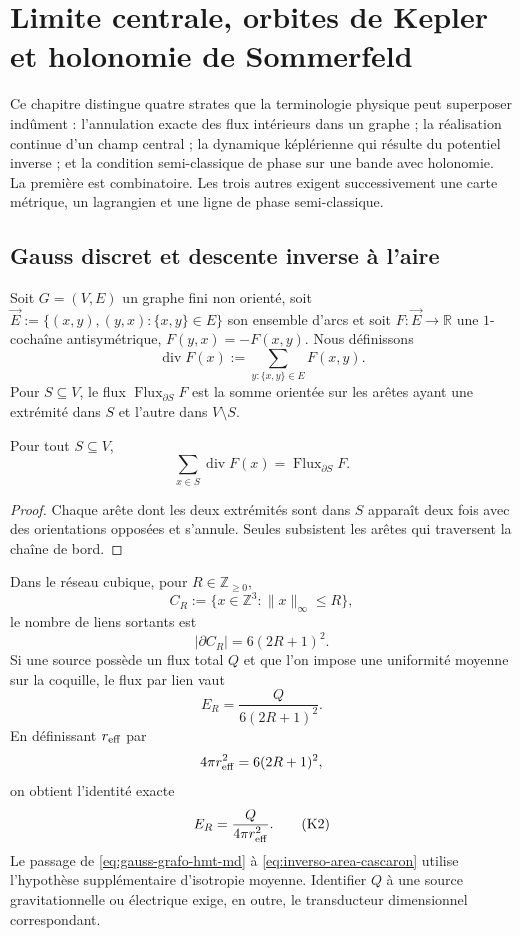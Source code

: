 \chapter{Limite centrale, orbites de Kepler et holonomie de Sommerfeld}
\label{chap:limite-central-kepler-sommerfeld}

Ce chapitre distingue quatre strates que la terminologie physique peut
superposer indûment : l'annulation exacte des flux intérieurs dans un
graphe ; la réalisation continue d'un champ central ; la dynamique képlérienne
qui résulte du potentiel inverse ; et la condition semi-classique de phase sur
une bande avec holonomie. La première est combinatoire. Les trois autres
exigent successivement une carte métrique, un lagrangien et une ligne de
phase semi-classique.

\section{Gauss discret et descente inverse à l'aire}
\label{sec:gauss-discreto-limite-central}

Soit \(G=(V,E)\) un graphe fini non orienté, soit
\(\vec E:=\{(x,y),(y,x):\{x,y\}\in E\}\) son ensemble d'arcs et soit
\(F:\vec E\to\mathbb R\) une \(1\)-co\-chaîne antisymétrique,
\(F(y,x)=-F(x,y)\). Nous définissons
\[
 \operatorname{div}F(x)
 :=\sum_{y:\{x,y\}\in E}F(x,y).
\]
Pour \(S\subseteq V\), le flux
\(\operatorname{Flux}_{\partial S}F\) est la somme orientée sur les arêtes
ayant une extrémité dans \(S\) et l'autre dans \(V\setminus S\).

\begin{theorem}
\label{thm:gauss-grafo-hmt-md}
Pour tout \(S\subseteq V\),
\[
 \sum_{x\in S}\operatorname{div}F(x)
 =\operatorname{Flux}_{\partial S}F.
 \tag{K1}\label{eq:gauss-grafo-hmt-md}
\]
\end{theorem}

\begin{proof}
Chaque arête dont les deux extrémités sont dans \(S\) apparaît deux fois avec des orientations
opposées et s'annule. Seules subsistent les arêtes qui traversent la chaîne
de bord.
\end{proof}

Dans le réseau cubique, pour \(R\in\mathbb Z_{\geq0}\),
\[
 C_R:=\{x\in\mathbb Z^3:\|x\|_\infty\leq R\},
\]
le nombre de liens sortants est
\[
 |\partial C_R|=6(2R+1)^2.
\]
Si une source possède un flux total \(Q\) et que l'on impose une uniformité moyenne sur la
coquille, le flux par lien vaut
\[
 E_R=\frac{Q}{6(2R+1)^2}.
\]
En définissant \(r_{\rm eff}\) par
\[
 4\pi r_{\rm eff}^2=6(2R+1)^2,
\]
on obtient l'identité exacte
\[
 E_R=\frac{Q}{4\pi r_{\rm eff}^2}.
 \tag{K2}\label{eq:inverso-area-cascaron}
\]
Le passage de \eqref{eq:gauss-grafo-hmt-md} à
\eqref{eq:inverso-area-cascaron} utilise l'hypothèse supplémentaire d'isotropie
moyenne. Identifier \(Q\) à une source gravitationnelle ou électrique exige,
en outre, le transducteur dimensionnel correspondant.

